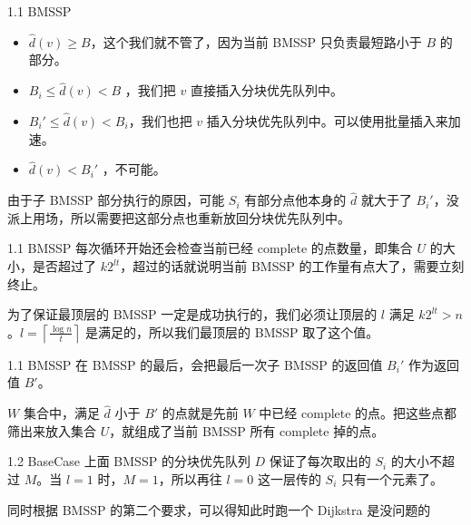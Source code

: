 \documentclass{beamer}
\begin{document}
\begin{frame}{1.1 BMSSP}
  \begin{center}
  \end{center}

  \pause

  \begin{itemize}
    \item $\hat{d}(v)\ge B$，这个我们就不管了，因为当前 BMSSP 只负责最短路小于 $B$ 的部分。
    \pause
    \item $B_i\le \hat{d}(v) < B$ ，我们把 $v$ 直接插入分块优先队列中。
    \pause
    \item $B_i'\le \hat{d}(v) <B_i$，我们也把 $v$ 插入分块优先队列中。可以使用批量插入来加速。
    \pause
    \item $\hat{d}(v) < B_i'$ ，不可能。
  \end{itemize}

  \pause

  由于子 BMSSP 部分执行的原因，可能 $S_i$ 有部分点他本身的 $\hat{d}$ 就大于了 $B_i'$，没派上用场，所以需要把这部分点也重新放回分块优先队列中。
\end{frame}

\begin{frame}{1.1 BMSSP}
  每次循环开始还会检查当前已经 complete 的点数量，即集合 $U$ 的大小，是否超过了 $k2^{lt}$，超过的话就说明当前 BMSSP 的工作量有点大了，需要立刻终止。

  \pause\vspace{0.35em}
    为了保证最顶层的 BMSSP 一定是成功执行的，我们必须让顶层的 $l$ 满足 $k2^{lt}>n$。$l=\left\lceil \frac{\log n}{t} \right\rceil$ 是满足的，所以我们最顶层的 BMSSP 取了这个值。
\end{frame}
\begin{frame}{1.1 BMSSP}
  在 BMSSP 的最后，会把最后一次子 BMSSP 的返回值 $B_i'$ 作为返回值 $B'$。

  \pause\vspace{0.35em}
  $W$ 集合中，满足 $\hat{d}$ 小于 $B'$ 的点就是先前 $W$ 中已经 complete 的点。把这些点都筛出来放入集合 $U$，就组成了当前 BMSSP 所有 complete 掉的点。
\end{frame}

\begin{frame}{1.2 BaseCase}
  上面 BMSSP 的分块优先队列 $D$ 保证了每次取出的 $S_i$ 的大小不超过 $M$。当 $l=1$ 时，$M=1$，所以再往 $l=0$ 这一层传的 $S_i$ 只有一个元素了。

  \pause\vspace{0.35em}
  同时根据 BMSSP 的第二个要求，可以得知此时跑一个 Dijkstra 是没问题的
\end{frame}
\end{document}
